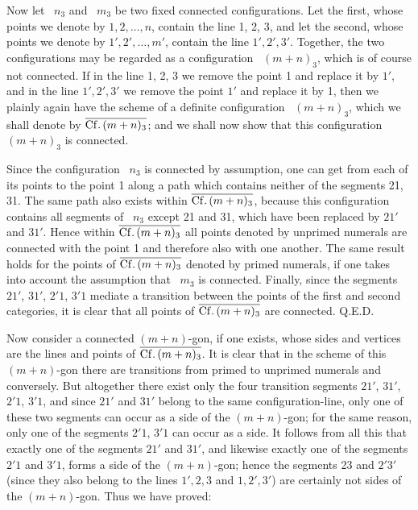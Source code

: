 \documentclass[11pt,a4paper]{article}
\begin{document}
Now let \Cf\ $n_3$ and \Cf\ $m_3$ be two fixed connected configurations. Let the first, whose points we denote by $1,2,\ldots,n$, contain the line 1, 2, 3, and let the second, whose points we denote by $1',2',\ldots,m'$, contain the line $1',2',3'$. Together, the two configurations may be regarded as a configuration \Cf\ $(m+n)_3$, which is of course not connected. If in the line 1, 2, 3 we remove the point 1 and replace it by $1'$, and in the line $1',2',3'$ we remove the point $1'$ and replace it by 1, then we plainly again have the scheme of a definite configuration \Cf\ $(m+n)_3$, which we shall denote by $\overline{\mathrm{Cf.}\,(m+n)_3}$; and we shall now show that this configuration \Cf\ $(m+n)_3$ is connected.

Since the configuration \Cf\ $n_3$ is connected by assumption, one can get from each of its points to the point 1 along a path which contains neither of the segments 21, 31. The same path also exists within $\overline{\mathrm{Cf.}\,(m+n)_3}$, because this configuration contains all segments of \Cf\ $n_3$ except 21 and 31, which have been replaced by $21'$ and $31'$. Hence within $\overline{\mathrm{Cf.}\,(m+n)_3}$ all points denoted by unprimed numerals are connected with the point 1 and therefore also with one another. The same result holds for the points of $\overline{\mathrm{Cf.}\,(m+n)_3}$ denoted by primed numerals, if one takes into account the assumption that \Cf\ $m_3$ is connected. Finally, since the segments $21'$, $31'$, $2'1$, $3'1$ mediate a transition between the points of the first and second categories, it is clear that all points of $\overline{\mathrm{Cf.}\,(m+n)_3}$ are connected. Q.E.D.

Now consider a connected $(m+n)$-gon, if one exists, whose sides and vertices are the lines and points of $\overline{\mathrm{Cf.}\,(m+n)_3}$. It is clear that in the scheme of this $(m+n)$-gon there are transitions from primed to unprimed numerals and conversely. But altogether there exist only the four transition segments $21'$, $31'$, $2'1$, $3'1$, and since $21'$ and $31'$ belong to the same configuration-line, only one of these two segments can occur as a side of the $(m+n)$-gon; for the same reason, only one of the segments $2'1$, $3'1$ can occur as a side. It follows from all this that exactly one of the segments $21'$ and $31'$, and likewise exactly one of the segments $2'1$ and $3'1$, forms a side of the $(m+n)$-gon; hence the segments 23 and $2'3'$ (since they also belong to the lines $1',2,3$ and $1,2',3'$) are certainly not sides of the $(m+n)$-gon. Thus we have proved:
\end{document}
